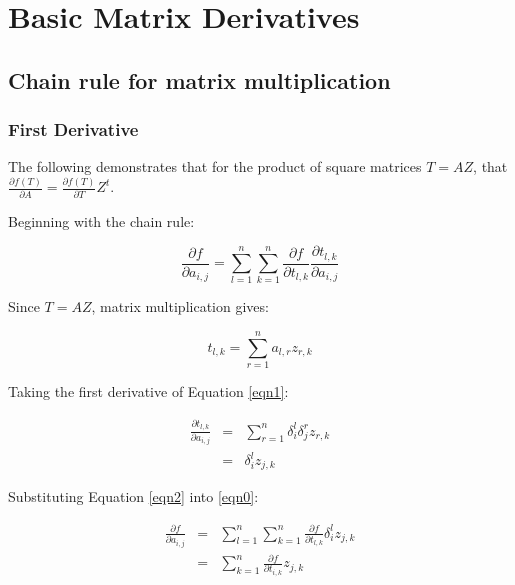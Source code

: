 \documentclass{report}
\begin{document}
\chapter{Basic Matrix Derivatives}


\section{Chain rule for matrix multiplication}

\subsection{First Derivative}

The following demonstrates that for the product of square matrices $T = A Z$,
that $\frac{\partial f(T)}{\partial A} = \frac{\partial f(T)}{\partial T} Z^t$. \newline

\noindent Beginning with the chain rule:

\begin{equation} 
\label{eqn0}
\frac{\partial f}{\partial a_{i,j}} = 
\sum_{l=1}^{n} \sum_{k=1}^{n} 
\frac{\partial f}{\partial t_{l,k}} 
\frac{\partial t_{l,k}}{\partial a_{i,j}}
\end{equation}

\noindent Since $T=AZ$, matrix multiplication gives:

\begin{equation}
\label{eqn1}
t_{l,k} = \sum_{r=1}^n a_{l,r} z_{r,k}
\end{equation}

\noindent Taking the first derivative of Equation \ref{eqn1}:

\begin{eqnarray}
\frac{\partial t_{l,k}}{\partial a_{i,j}} 
  &=& \sum_{r=1}^n \delta_i^l \delta_j^r z_{r,k} \\
  &=& \delta_i^l z_{j,k} \label{eqn2}
\end{eqnarray}

\noindent Substituting Equation \ref{eqn2} into \ref{eqn0}:

\begin{eqnarray}
\frac{\partial f}{\partial a_{i,j}} &=& \sum_{l=1}^n \sum_{k=1}^n
 \frac{\partial f}{\partial t_{l,k}} \delta_i^l z_{j,k} \\
&=& \sum_{k=1}^{n} \frac{ \partial f}{ \partial t_{i,k}} z_{j,k} \label{eqn4}
\end{eqnarray}
\end{document}

